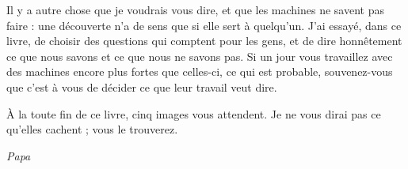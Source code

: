 \medskip
Il y a autre chose que je voudrais vous dire, et que les machines ne savent pas faire : une découverte n'a de sens
que si elle sert à quelqu'un. J'ai essayé, dans ce livre, de choisir des questions qui comptent pour les gens, et de
dire honnêtement ce que nous savons et ce que nous ne savons pas. Si un jour vous travaillez avec des machines
encore plus fortes que celles-ci, ce qui est probable, souvenez-vous que c'est à vous de décider ce que leur travail
veut dire.

À la toute fin de ce livre, cinq images vous attendent. Je ne vous dirai pas ce qu'elles cachent ; vous le trouverez.

\bigskip
\begin{flushright}
\emph{Papa}
\end{flushright}
